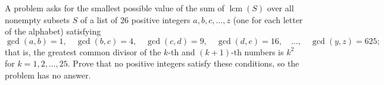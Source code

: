 A problem asks for the smallest possible value of the sum of $\operatorname{lcm}(S)$ over all nonempty subsets $S$ of a list of $26$ positive integers $a,b,c,\dots,z$ (one for each letter of the alphabet) satisfying
\[\gcd(a,b)=1,\quad\gcd(b,c)=4,\quad\gcd(c,d)=9,\quad\gcd(d,e)=16,\quad\dots,\quad\gcd(y,z)=625;\]
that is, the greatest common divisor of the $k$-th and $(k+1)$-th numbers is $k^2$ for $k=1,2,\dots,25$. Prove that no positive integers satisfy these conditions, so the problem has no answer.
